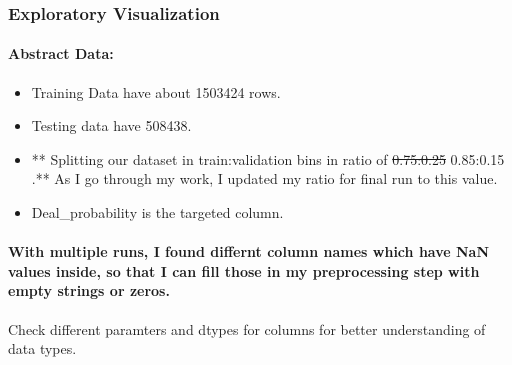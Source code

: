 \documentclass[11pt]{article}
\providecommand{\tightlist}{%
      \setlength{\itemsep}{0pt}\setlength{\parskip}{0pt}}
\begin{document}
    \hypertarget{exploratory-visualization}{%
\subsubsection{Exploratory
Visualization}\label{exploratory-visualization}}

    \hypertarget{abstract-data}{%
\paragraph{Abstract Data:}\label{abstract-data}}

\begin{itemize}
\tightlist
\item
  Training Data have about 1503424 rows.
\item
  Testing data have 508438.
\item
  ** Splitting our dataset in train:validation bins in ratio of
  \sout{0.75:0.25} 0.85:0.15 .** As I go through my work, I updated my
  ratio for final run to this value.
\item
  Deal\_probability is the targeted column.
\end{itemize}

    \hypertarget{with-multiple-runs-i-found-differnt-column-names-which-have-nan-values-inside-so-that-i-can-fill-those-in-my-preprocessing-step-with-empty-strings-or-zeros.}{%
\paragraph{With multiple runs, I found differnt column names which have
NaN values inside, so that I can fill those in my preprocessing step
with empty strings or
zeros.}\label{with-multiple-runs-i-found-differnt-column-names-which-have-nan-values-inside-so-that-i-can-fill-those-in-my-preprocessing-step-with-empty-strings-or-zeros.}}

Check different paramters and dtypes for columns for better
understanding of data types.
\end{document}
